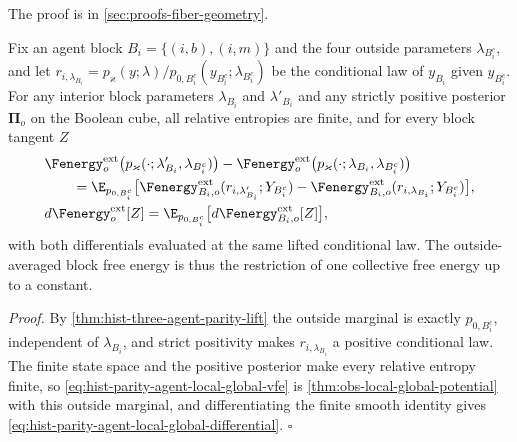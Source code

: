 The proof is in \cref{sec:proofs-fiber-geometry}.

Fix an agent block $B_i=\{(i,b),(i,m)\}$ and the four outside parameters
$\lambda_{B_i^c}$, and let $r_{i,\lambda_{B_i}}=p_\varkappa(y;\lambda)/p_{0,B_i^c}
(y_{B_i^c};\lambda_{B_i^c})$ be the conditional law of $y_{B_i}$ given $y_{B_i^c}$.  For
any interior block
parameters $\lambda_{B_i}$ and $\lambda'_{B_i}$ and any strictly positive posterior
$\boldsymbol\Pi_o$ on the Boolean cube, all relative entropies are finite, and for every
block tangent $Z$
\begin{align}
&\Fenergy_o^{\rm ext}\bigl(p_\varkappa(\cdot;\lambda'_{B_i},\lambda_{B_i^c})\bigr)
-\Fenergy_o^{\rm ext}\bigl(p_\varkappa(\cdot;\lambda_{B_i},\lambda_{B_i^c})\bigr)
\notag\\
&\qquad=\E_{p_{0,B_i^c}}\bigl[
\Fenergy_{B_i,o}^{\rm ext}(r_{i,\lambda'_{B_i}};Y_{B_i^c})
-\Fenergy_{B_i,o}^{\rm ext}(r_{i,\lambda_{B_i}};Y_{B_i^c})\bigr],
\label{eq:hist-parity-agent-local-global-vfe}\\
&d\Fenergy_o^{\rm ext}[Z]
=\E_{p_{0,B_i^c}}\bigl[d\Fenergy_{B_i,o}^{\rm ext}[Z]\bigr],
\label{eq:hist-parity-agent-local-global-differential}
\end{align}
with both differentials evaluated at the same lifted conditional law.  The
outside-averaged block free energy is thus the restriction of one collective free energy
up to a constant.  

\noindent\emph{Proof.}
By \cref{thm:hist-three-agent-parity-lift} the outside marginal is exactly
$p_{0,B_i^c}$, independent of $\lambda_{B_i}$, and strict positivity makes
$r_{i,\lambda_{B_i}}$ a positive conditional law.  The finite state space and the
positive posterior make every relative entropy finite, so
\eqref{eq:hist-parity-agent-local-global-vfe} is \cref{thm:obs-local-global-potential}
with this outside marginal, and differentiating the finite smooth identity gives
\eqref{eq:hist-parity-agent-local-global-differential}.  $\square$

